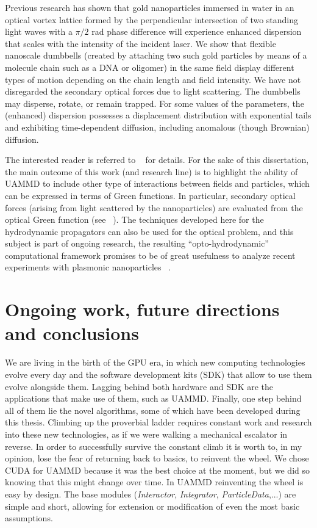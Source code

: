 \documentclass[ twoside,openright,titlepage,numbers=noenddot,%
headinclude,footinclude,cleardoublepage=empty,abstract=on,
BCOR=5mm,paper=b5,fontsize=11pt, dvipsnames
]{scrreprt}
\begin{document}
Previous research has shown that gold nanoparticles immersed in water in an optical vortex lattice formed by the perpendicular intersection of two standing light waves with a $\pi/2$ rad phase difference will experience enhanced dispersion that scales with the intensity of the incident laser. We show that flexible nanoscale dumbbells (created by attaching two such gold particles by means of a molecule chain such as a DNA or oligomer) in the same field display different types of motion depending on the chain length and field intensity. We have not disregarded the secondary optical forces due to light scattering. The dumbbells may disperse, rotate, or remain trapped. For some values of the parameters, the (enhanced) dispersion possesses a displacement distribution with exponential tails and exhibiting time-dependent diffusion, including anomalous (though Brownian) diffusion.

The interested reader is referred to ~\cite{Melendez2019} for details. For the sake of this dissertation, the main outcome of this work (and research line) is to highlight the ability of UAMMD to include other type of interactions between fields and particles, which can be expressed in terms of Green functions. In particular, secondary optical forces (arising from light scattered by the nanoparticles) are evaluated from the optical Green function (see ~\cite{Buscalioni2018,Melendez2019}). The techniques developed here for the hydrodynamic propagators can also be used for the optical problem, and this subject is part of ongoing research, the resulting ``opto-hydrodynamic'' computational framework promises to be of great usefulness to analyze recent experiments with plasmonic nanoparticles ~\cite{Ye2020}.






\chapter{Ongoing work, future directions and conclusions}\label{ch:conclusions}
We are living in the birth of the GPU era, in which new computing technologies evolve every day and the software development kits (SDK) that allow to use them evolve alongside them. Lagging behind both hardware and SDK are the applications that make use of them, such as UAMMD. Finally, one step behind all of them lie the novel algorithms, some of which have been developed during this thesis. Climbing up the proverbial ladder requires constant work and research into these new technologies, as if we were walking a mechanical escalator in reverse. In order to successfully survive the constant climb it is worth to, in my opinion, lose the fear of returning back to basics, to reinvent the wheel. We chose CUDA for UAMMD because it was the best choice at the moment, but we did so knowing that this might change over time. In UAMMD reinventing the wheel is easy by design. The base modules (\emph{Interactor}, \emph{Integrator}, \emph{ParticleData},...) are simple and short, allowing for extension or modification of even the most basic assumptions. 
\end{document}
